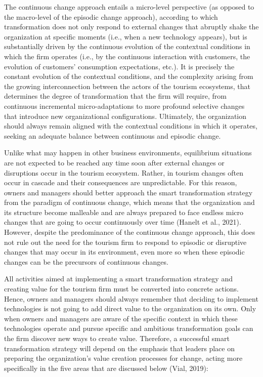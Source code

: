 \documentclass[
  letterpaper,
  DIV=11,
  numbers=noendperiod]{scrreprt}
\begin{document}
The continuous change approach entails a micro-level perspective (as
opposed to the macro-level of the episodic change approach), according
to which transformation does not only respond to external changes that
abruptly shake the organization at specific moments (i.e., when a new
technology appears), but is substantially driven by the continuous
evolution of the contextual conditions in which the firm operates (i.e.,
by the continuous interaction with customers, the evolution of
customers' consumption expectations, etc.). It is precisely the constant
evolution of the contextual conditions, and the complexity arising from
the growing interconnection between the actors of the tourism
ecosystems, that determines the degree of transformation that the firm
will require, from continuous incremental micro-adaptations to more
profound selective changes that introduce new organizational
configurations. Ultimately, the organization should always remain
aligned with the contextual conditions in which it operates, seeking an
adequate balance between continuous and episodic change.

Unlike what may happen in other business environments, equilibrium
situations are not expected to be reached any time soon after external
changes or disruptions occur in the tourism ecosystem. Rather, in
tourism changes often occur in cascade and their consequences are
unpredictable. For this reason, owners and managers should better
approach the smart transformation strategy from the paradigm of
continuous change, which means that the organization and its structure
become malleable and are always prepared to face endless micro changes
that are going to occur continuously over time (Hanelt et al., 2021).
However, despite the predominance of the continuous change approach,
this does not rule out the need for the tourism firm to respond to
episodic or disruptive changes that may occur in its environment, even
more so when these episodic changes can be the precursors of continuous
changes.

All activities aimed at implementing a smart transformation strategy and
creating value for the tourism firm must be converted into concrete
actions. Hence, owners and managers should always remember that deciding
to implement technologies is not going to add direct value to the
organization on its own. Only when owners and managers are aware of the
specific context in which these technologies operate and pursue specific
and ambitious transformation goals can the firm discover new ways to
create value. Therefore, a successful smart transformation strategy will
depend on the emphasis that leaders place on preparing the
organization's value creation processes for change, acting more
specifically in the five areas that are discussed below (Vial, 2019):
\end{document}
